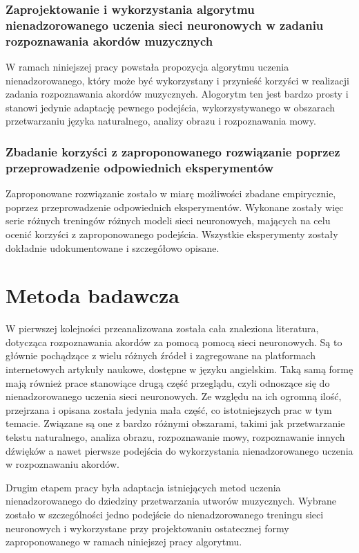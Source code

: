 \subsubsection{Zaprojektowanie i wykorzystania algorytmu nienadzorowanego uczenia sieci neuronowych w zadaniu rozpoznawania akordów muzycznych}

W ramach niniejszej pracy powstała propozycja algorytmu uczenia nienadzorowanego, który może być wykorzystany i przynieść korzyści w realizacji zadania rozpoznawania akordów muzycznych. Alogorytm ten jest bardzo prosty i stanowi jedynie adaptację pewnego podejścia, wykorzystywanego w obszarach przetwarzaniu języka naturalnego, analizy obrazu i rozpoznawania mowy.

\subsubsection{Zbadanie korzyści z zaproponowanego rozwiązanie poprzez przeprowadzenie odpowiednich eksperymentów}

Zaproponowane rozwiązanie zostało w miarę możliwości zbadane empirycznie, poprzez przeprowadzenie odpowiednich eksperymentów. Wykonane zostały więc serie różnych treningów różnych modeli sieci neuronowych, mających na celu ocenić korzyści z zaproponowanego podejścia. Wszystkie eksperymenty zostały dokładnie udokumentowane i szczegółowo opisane.



\section{Metoda badawcza}

W pierwszej kolejności przeanalizowana została cała znaleziona literatura, dotycząca rozpoznawania akordów za pomocą pomocą sieci neuronowych. Są to głównie pochądzące z wielu różnych źródeł i zagregowane na platformach internetowych artykuły naukowe, dostępne w języku angielskim. Taką samą formę mają również prace stanowiące drugą część przeglądu, czyli odnoszące się do nienadzorowanego uczenia sieci neuronowych. Ze względu na ich ogromną ilość, przejrzana i opisana została jedynia mała część, co istotniejszych prac w tym temacie. Związane są one z bardzo różnymi obszarami, takimi jak przetwarzanie tekstu naturalnego, analiza obrazu, rozpoznawanie mowy, rozpoznawanie innych dźwięków a nawet pierwsze podejścia do wykorzystania nienadzorowanego uczenia w rozpoznawaniu akordów.

Drugim etapem pracy była adaptacja istniejących metod uczenia nienadzorowanego do dziedziny przetwarzania utworów muzycznych. Wybrane zostało w szczególności jedno podejście do nienadzorowanego treningu sieci neuronowych i wykorzystane przy projektowaniu ostatecznej formy zaproponowanego w ramach niniejszej pracy algorytmu.

